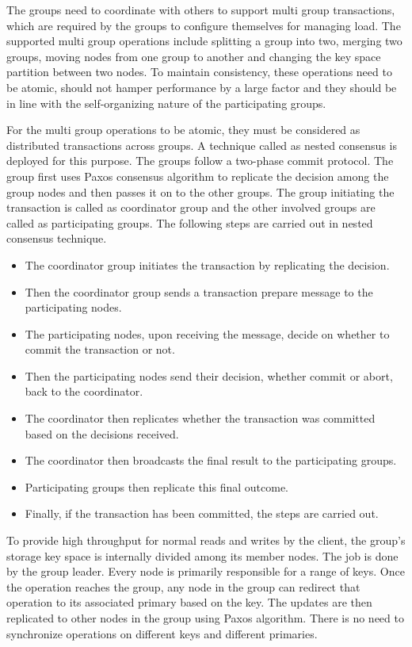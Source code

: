 \documentclass[11pt,a4paper]{article}
\begin{document}
    The groups need to coordinate with others to support multi group transactions, which are required by the groups to configure themselves for managing load. The supported multi group operations include splitting a group into two, merging two groups, moving nodes from one group to another and changing the key space partition between two nodes. To maintain consistency, these operations need to be atomic, should not hamper performance by a large factor and they should be in line with the self-organizing nature of the participating groups.
    
    For the multi group operations to be atomic, they must be considered as distributed transactions across groups. A technique called as nested consensus is deployed for this purpose. The groups follow a two-phase commit protocol. The group first uses Paxos consensus algorithm to replicate the decision among the group nodes and then passes it on to the other groups. The group initiating the transaction is called as coordinator group and the other involved groups are called as participating groups. The following steps are carried out in nested consensus technique.
    
    \begin{itemize}
        
        \item	The coordinator group initiates the transaction by replicating the decision. 
        \item	Then the coordinator group sends a transaction prepare message to the participating nodes. 
        \item	The participating nodes, upon receiving the message, decide on whether to commit the transaction or not.
        \item	Then the participating nodes send their decision, whether commit or abort, back to the coordinator.
        \item	The coordinator then replicates whether the transaction was committed based on the decisions received.
        \item	The coordinator then broadcasts the final result to the participating groups.
        \item	Participating groups then replicate this final outcome.
        \item	Finally, if the transaction has been committed, the steps are carried out.
        
    \end{itemize}
    
    To provide high throughput for normal reads and writes by the client, the group’s storage key space is internally divided among its member nodes. The job is done by the group leader. Every node is primarily responsible for a range of keys. Once the operation reaches the group, any node in the group can redirect that operation to its associated primary based on the key. The updates are then replicated to other nodes in the group using Paxos algorithm. There is no need to synchronize operations on different keys and different primaries.
    
\end{document}
